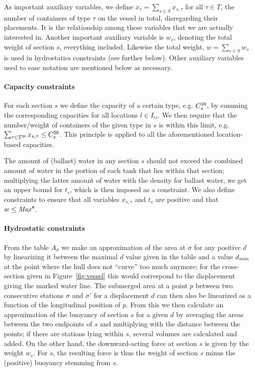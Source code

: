 As important auxiliary variables, we define $x_\tau = \sum_{s\in S} x_{s,\tau}$ for all $\tau\in T$, the number of containers of type $\tau$ on the vessel in total, disregarding their placements. It is the relationship among these variables that we are actually interested in.  
Another important auxiliary variable is $w_s$, denoting the total weight of section $s$, everything included. Likewise the total weight, $w = \sum_{s\in S}w_s$ is used in hydrostatics constraints (see further below). 
Other auxiliary variables used to ease notation are mentioned below as necessary.

\paragraph{Capacity constraints}
For each section $s$ we define the capacity of a certain type, e.g. $C^{\texttt{20}}_s$, by summing the corresponding capacities for all locations $l\in L_s$. We then require that the number/weight of containers of the given type in $s$ is within this limit, e.g. $\sum_{\tau \in T^{\texttt{20}}}x_{s,\tau}\leq C^{\texttt{20}}_s$. 
This principle is applied to all the aforementioned location-based capacities.

The amount of (ballast) water in any section $s$ should not exceed the combined amount of water in the portion of each tank that lies within that section; multiplying the latter amount  of water with the density for ballast water, we get an upper bound for $t_s$, which is then imposed as a constraint.
We also define constraints to ensure that all variables $x_{s,\tau}$ and $t_s$ are positive and that $w\leq\mathit{Max}^{\texttt{w}}$. 

\paragraph{Hydrostatic constraints}
From the table $A_{\sigma}$ we make an approximation of the area at $\sigma$ for any positive $d$ by linearizing it between the maximal $d$ value given in the table and a value $d_\mathit{min}$ at the point where the hull does not ``curve'' too much anymore; for the cross-section given in Figure~\ref{fig:vessel} this would correspond to the displacement giving the marked water line.
The submerged area at a point $p$ between two consecutive stations $\sigma$ and $\sigma'$ for a displacement $d$ can then also be linearized as a function of the longitudinal position of $p$. 
From this we then calculate an approximation of the buoyancy of section $s$ for a given $d$ by averaging the areas between the two endpoints of $s$ and multiplying with the distance between the points; if there are stations lying within $s$, several volumes are calculated and added.
On the other hand, the downward-acting force at section $s$ is given by the weight $w_s$. For $s$, the resulting force is thus the weight of section $s$ minus the (positive) buoyancy stemming from $s$.  
  
